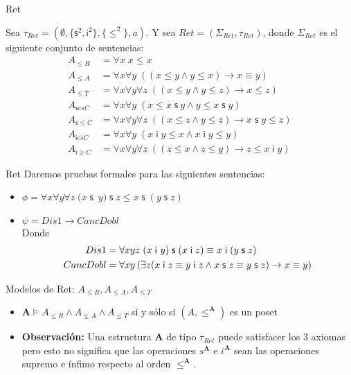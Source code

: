 \documentclass[10pt]{beamer}
\newcommand{\A}{\mathbf{A}}
\newcommand{\poset}{(A, \leq^{\mathbf{A}})}
\newcommand{\Nand}{\wedge}
\newcommand{\refl}{\forall x\;x\leq x}
\newcommand{\Nrefl}{{A}_{\leq R}}
\newcommand{\anti}{\forall x\forall y\;\left( \left( x\leq y\wedge y\leq
x\right) \rightarrow x\equiv y\right)}
\newcommand{\Nanti}{{A}_{\leq A}}
\newcommand{\trans}{\forall x\forall y\forall z\;\left( (x\leq y\wedge
y\leq z)\rightarrow x\leq z\right)}
\newcommand{\Ntrans}{{A}_{\leq T}}
\newcommand{\sCot}{\forall x\forall y\;(x\leq x\;\mathsf{s}\ y\wedge y\leq x\;\mathsf{s}\;y)}
\newcommand{\NsCot}{{A}_{\mathsf{s}esC}}
\newcommand{\sLesCot}{\forall x\forall y\forall z\;\left( (x\leq
z\wedge y\leq z)\rightarrow x\;\text{$\mathsf{s\;}$}y\leq z\right)}
\newcommand{\NsLesCot}{{A}_{\mathsf{s}\leq C}}
\newcommand{\iCot}{\forall x\forall y\;(x\;\mathsf{i}\;y\leq
x\wedge x\;\mathsf{i}\;y\leq y)}
\newcommand{\NiCot}{{A}_{\mathsf{i}esC}}
\newcommand{\iGrCot}{\forall x\forall y\forall z\;\left( (z\leq
x\wedge z\leq y)\rightarrow z\leq x\;\mathsf{i}\;y\right)}
\newcommand{\NiGrCot}{{A}_{\mathsf{i}\geq C}}
\newcommand{\assoc}{\forall x\forall y\forall
z\;(x\;\mathsf{s}$\ $y)\;\mathsf{s}\;z\leq x\;\mathsf{s}\;(y\;\mathsf{s}\;z)}
\newcommand{\acot}{Dis1\rightarrow CancDobl}
\begin{document}
\begin{frame}{Ret}
  \begin{center}

    Sea $\tau _{Ret}=(\emptyset ,\{\mathsf{s}^{2},\mathsf{i}^{2}\},\{\leq
    ^{2}\},a)$. Y sea $Ret=(\Sigma _{Ret},\tau _{Ret})$, donde $\Sigma _{Ret}$
    es el siguiente conjunto de sentencias:
    \pause
    \begin{align}
       \Nrefl &= \refl \nonumber\\
       \Nanti &= \anti \nonumber \\
       \Ntrans &= \trans \nonumber \\
       \NsCot &= \sCot \nonumber \\
       \NsLesCot &= \sLesCot \nonumber \\
       \NiCot &= \iCot \nonumber \\
       \NiGrCot &= \iGrCot \nonumber
    \end{align}
    \setcounter{equation}{0}



  \end{center}
\end{frame}

\begin{frame}{Ret}
  Daremos pruebas formales para las siguientes sentencias:
  \begin{itemize}[<+->]

  \item $ \phi = \assoc $
  \item  $ \psi = \acot $
  \\ Donde \\
    \begin{align}
    Dis1 &= \forall xyz\;(x\;\mathsf{i}\
    y)\;\mathsf{s}\;(x\;\mathsf{i}\;z)\equiv x\;\mathsf{i}\;(y\;\mathsf{s}%
    \;z) \nonumber \\
    CancDobl &= \forall xy\left( \exists z(x\;\mathsf{i}\;z\equiv y\;\mathsf{%
    i}\;z\wedge x\;\mathsf{s}\;z\equiv y\;\mathsf{s}\;z)\rightarrow x\equiv
    y\right) \nonumber
  \end{align}
  \end{itemize}

\end{frame}


\begin{frame}{Modelos de Ret: $ \Nrefl, \Nanti, \Ntrans$}

  \begin{itemize}[<+->]

    \item $ \A \models \Nrefl \Nand \Nanti \Nand \Ntrans $ si y sólo si
    $\poset$ es un poset

    \item \textbf{Observación:} Una estructura $\A$ de tipo $\tau_{Ret}$ puede
            satisfacer los 3 axiomas pero esto no significa que las operaciones
            $ s^{\A} $ e $ i^{\A} $ sean las operaciones supremo e ínfimo respecto
            al orden $ \leq^{\A} $.
  \end{itemize}
\end{frame}
\end{document}
